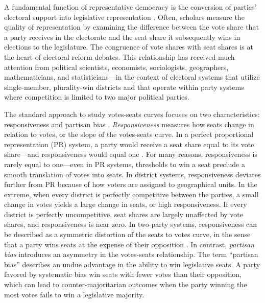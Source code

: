 \documentclass[letter,12pt]{article}
\let\footnote=\endnote
\begin{document}
\noindent A fundamental function of representative democracy is the conversion of parties' electoral support into legislative representation \citep{lijphartElSysPtySys.1994}. Often, scholars measure the quality of representation by examining the difference between the vote share that a party receives in the electorate and the seat share it subsequently wins in elections to the legislature. The congruence of vote shares with seat shares is at the heart of electoral reform debates. This relationship has received much attention from political scientists, economists, sociologists, geographers, mathematicians, and statisticians---in the context of electoral systems that utilize single-member, plurality-win districts and that operate within party systems where competition is limited to two major political parties.\footnote{See \citet{altman.mcdonald2011bard,balinskiYoung2001FairRep,brady.grofmanBiasResponsiveness1991,cain.partisanRedistricting.1985,cox.katz.2002,engstrom2006redisttrictApsr,erikson1972malapportionment,gelman.king.1994EvalElSysRedis,grofmanBiasProportionality.1983,grofman.etalBiasMalapp.1997,gudgin.taylor.1980decomposeBias,JohnstonCreepingMal,kendall.stuartCubeLaw1950,king.browning1987biasRespUS,niemi.fett1986swing,rae.1967,rossiter.etal.1997,taagepera.CubeLaw.1973,trelles.mtz.polygob2012,tufte1973seatsVotes}.\label{fn:cites}}

The standard approach to study votes-seats curves focuses on two characteristics: responsiveness and partisan bias \citep{tufte1973seatsVotes,king.browning1987biasRespUS}. \emph{Responsiveness} measures how seats change in relation to votes, or the slope of the votes-seats curve. In a perfect proportional representation (PR) system, a party would receive a seat share equal to its vote share---and responsiveness would equal one \citep{taagepera.shugart.1989,linzerSeatVoteElasticity2012}. For many reasons, responsiveness is rarely equal to one---even in PR systems, thresholds to win a seat preclude a smooth translation of votes into seats. In district systems, responsiveness deviates further from PR because of how voters are assigned to geographical units. In the extreme, when every district is perfectly competitive between the parties, a small change in votes yields a large change in seats, or high responsiveness. If every district is perfectly uncompetitive, seat shares are largely unaffected by vote shares, and responsiveness is near zero. In two-party systems, responsiveness can be described as a symmetric distortion of the seats to votes curve, in the sense that a party wins seats at the expense of their opposition \citep{grofman.king.2008.partisansymmetry}. In contrast, \emph{partisan bias} introduces an asymmetry in the votes-seats relationship. The term ``partisan bias'' describes an undue advantage in the ability to win legislative seats. A party favored by systematic bias win seats with fewer votes than their opposition, which can lead to counter-majoritarian outcomes when the party winning the most votes fails to win a legislative majority.
\end{document}
